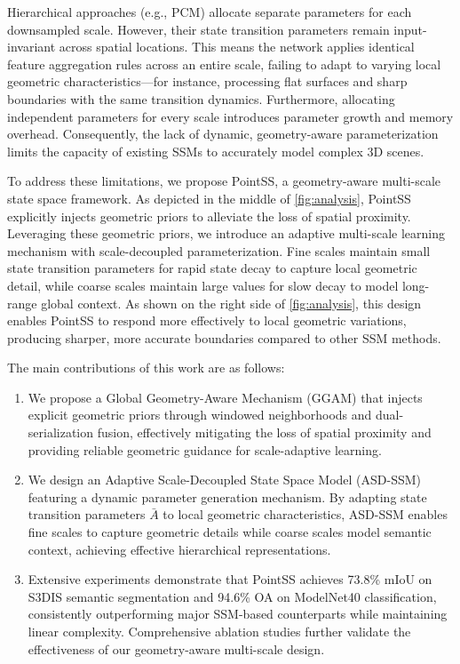\documentclass[a4paper,fleqn]{cas-sc}
\begin{document}
Hierarchical approaches (e.g., PCM) allocate separate parameters for each downsampled scale. However, their state transition parameters remain input-invariant across spatial locations. This means the network applies identical feature aggregation rules across an entire scale, failing to adapt to varying local geometric characteristics---for instance, processing flat surfaces and sharp boundaries with the same transition dynamics. Furthermore, allocating independent parameters for every scale introduces parameter growth and memory overhead. Consequently, the lack of dynamic, geometry-aware parameterization limits the capacity of existing SSMs to accurately model complex 3D scenes.


To address these limitations, we propose PointSS, a geometry-aware multi-scale state space framework. As depicted in the middle of \cref{fig:analysis}, PointSS explicitly injects geometric priors to alleviate the loss of spatial proximity. Leveraging these geometric priors, we introduce an adaptive multi-scale learning mechanism with scale-decoupled parameterization. Fine scales maintain small state transition parameters for rapid state decay to capture local geometric detail, while coarse scales maintain large values for slow decay to model long-range global context. As shown on the right side of \cref{fig:analysis}, this design enables PointSS to respond more effectively to local geometric variations, producing sharper, more accurate boundaries compared to other SSM methods.

The main contributions of this work are as follows:

\begin{enumerate}
	\item We propose a Global Geometry-Aware Mechanism (GGAM) that injects
	explicit geometric priors through windowed neighborhoods and dual-
	serialization fusion, effectively mitigating the loss of spatial proximity
	and providing reliable geometric guidance for scale-adaptive learning.

	\item We design an Adaptive Scale-Decoupled State Space Model (ASD-SSM)
	featuring a dynamic parameter generation mechanism. By adapting state
	transition parameters $\bar{A}$ to local geometric characteristics, ASD-SSM
	enables fine scales to capture geometric details while coarse scales model
	semantic context, achieving effective hierarchical representations.

	\item Extensive experiments demonstrate that PointSS achieves 73.8\% mIoU
	on S3DIS semantic segmentation and 94.6\% OA on ModelNet40 classification,
	consistently outperforming major SSM-based counterparts while maintaining linear complexity.
	Comprehensive ablation studies further validate the effectiveness of our
	geometry-aware multi-scale design.
\end{enumerate}
\end{document}
